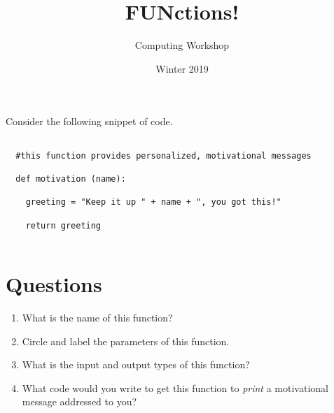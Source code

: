 \documentclass[11pt]{article}
\author{Computing Workshop}
\title{FUNctions!}
\date{Winter 2019}
\begin{document}
\maketitle

Consider the following snippet of code.
\begin{lstlisting}

  #this function provides personalized, motivational messages

  def motivation (name):

    greeting = "Keep it up " + name + ", you got this!"

    return greeting


\end{lstlisting}

\section*{Questions}
\begin{enumerate}
\item
  What is the name of this function?
  \vspace{2em}

\item
  Circle and label the parameters of this function.

\item
  What is the input and output types of this function?
  \vspace{2em}

\item
  What code would you write to get this function to \emph{print} a motivational message addressed to you?
  \vspace{4em}

\end{enumerate}
\end{document}

